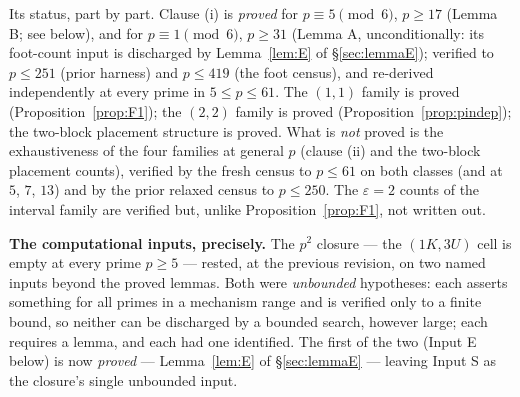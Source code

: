 \documentclass[11pt,a4paper]{article}
\numberwithin{equation}{section}
\theoremstyle{plain}
\theoremstyle{plain}
\theoremstyle{definition}
\theoremstyle{remark}
\begin{document}
Its status, part by part. Clause (i) is \emph{proved} for $p\equiv5\pmod6$,
$p\ge17$ (Lemma B; see below), and for $p\equiv1\pmod6$, $p\ge31$
(Lemma A, unconditionally: its foot-count input is discharged by
Lemma~\ref{lem:E} of \S\ref{sec:lemmaE}); verified to $p\le251$ (prior
harness) and $p\le419$ (the foot census), and re-derived independently
at every prime in $5\le p\le 61$. The $(1,1)$ family is proved (Proposition~\ref{prop:F1}); the $(2,2)$
family is proved (Proposition~\ref{prop:pindep}); the two-block placement
structure is proved. What is \emph{not} proved is the exhaustiveness of the
four families at general $p$ (clause (ii) and the two-block placement
counts), verified by the fresh census to $p\le61$ on both classes (and at
$5$, $7$, $13$) and by the prior relaxed census to $p\le250$. The
$\varepsilon=2$ counts of the interval family are verified but, unlike
Proposition~\ref{prop:F1}, not written out.

\medskip
\noindent\textbf{The computational inputs, precisely.} The $p^2$
closure --- the $(1K,3U)$ cell is empty at every prime $p\ge5$ --- rested,
at the previous revision, on two named inputs beyond the proved lemmas.
Both were \emph{unbounded} hypotheses: each asserts something for all
primes in a mechanism range and is verified only to a finite bound, so
neither can be discharged by a bounded search, however large; each
requires a lemma, and each had one identified. The first of the two
(Input E below) is now \emph{proved} --- Lemma~\ref{lem:E} of
\S\ref{sec:lemmaE} --- leaving Input S as the closure's single
unbounded input.
\end{document}
